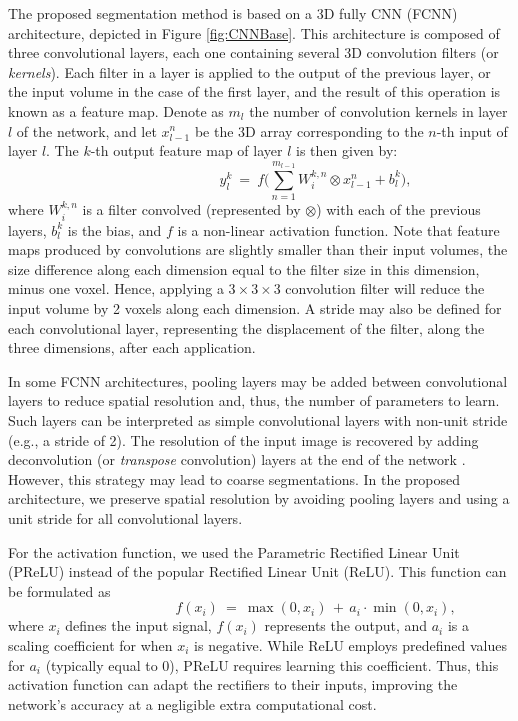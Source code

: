 \documentclass[twoside,fleqn,espcrc2]{elsarticle}
\newcommand{\vold}[1]{$#1\!\times\!#1\!\times\!#1$}
\begin{document}
The proposed segmentation method is based on a 3D fully CNN (FCNN) architecture, depicted in Figure \ref{fig:CNNBase}. This architecture is composed of three convolutional layers, each one containing several 3D convolution filters (or \emph{kernels}). Each filter in a layer is applied to the output of the previous layer, or the input volume in the case of the first layer, and the result of this operation is known as a feature map. Denote as $m_l$ the number of convolution kernels in layer $l$ of the network, and let $x^n_{l-1}$ be the 3D array corresponding to the $n$-th input of layer $l$. The $k$-th output feature map of layer $l$ is then given by:
\begin{equation}
\qquad \qquad \qquad \qquad 
    y^k_l \ = \ f\Big(\sum^{m_{l-1}}_{n=1} W^{k,n}_{i} \otimes x^n_{l-1} + b^{k}_{l}\Big),
\end{equation} 
where $W^{k,n}_{i}$ is a filter convolved (represented by $\otimes$) with each of the previous layers, $b^{k}_{l}$ is the bias, and $f$ is a non-linear activation function. Note that feature maps produced by convolutions are slightly smaller than their input volumes, the size difference along each dimension equal to the filter size in this dimension, minus one voxel. Hence, applying a \vold{3} convolution filter will reduce the input volume by 2 voxels along each dimension. A stride may also be defined for each convolutional layer, representing the displacement of the filter, along the three dimensions, after each application. 

In some FCNN architectures, pooling layers may be added between convolutional layers to reduce spatial resolution and, thus, the number of parameters to learn. Such layers can be interpreted as simple convolutional layers with non-unit stride (e.g., a stride of 2). The resolution of the input image is recovered by adding deconvolution (or \emph{transpose} convolution) layers at the end of the network \cite{long2015fully}. However, this strategy may lead to coarse segmentations. In the proposed architecture, we preserve spatial resolution by avoiding pooling layers and using a unit stride for all convolutional layers.


For the activation function, we used the Parametric Rectified Linear Unit (PReLU) \cite{he2015delving} instead of the popular Rectified Linear Unit (ReLU). This function can be formulated as
\begin{equation}
	\qquad \qquad \qquad \qquad	f(x_i) \ = \ \max(0,x_i) \, + \, a_i \! \cdot \! \min(0,x_i),
\end{equation}
where $x_i$ defines the input signal, $f(x_i)$ represents the output, and $a_i$ is a scaling coefficient for when $x_i$ is negative. While ReLU employs predefined values for $a_i$ (typically equal to 0), PReLU requires learning this coefficient. Thus, this activation function can adapt the rectifiers to their inputs, improving the network's accuracy at a negligible extra computational cost. 
\end{document}
